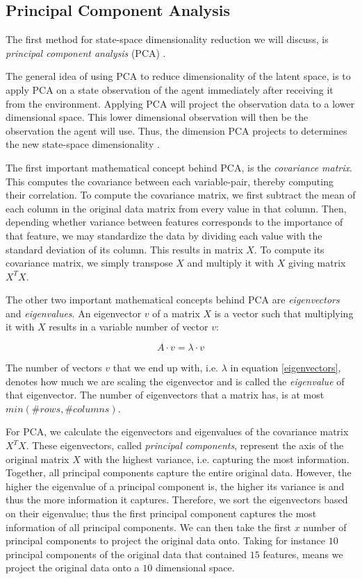 \subsection{Principal Component Analysis}\label{pl-pca}
The first method for state-space dimensionality reduction we will discuss, is \emph{principal component analysis} (PCA) \cite{pca}. 

The general idea of using PCA to reduce dimensionality of the latent space, is to apply PCA on a state observation of the agent immediately after receiving it from the environment. Applying PCA will project the observation data to a lower dimensional space. This lower dimensional observation will then be the observation the agent will use. Thus, the dimension PCA projects to determines the new state-space dimensionality \cite{mario}.

The first important mathematical concept behind PCA, is the \emph{covariance matrix}. This computes the covariance between each variable-pair, thereby computing their correlation. To compute the covariance matrix, we first subtract the mean of each column in the original data matrix from every value in that column. Then, depending whether variance between features corresponds to the importance of that feature, we may standardize the data by dividing each value with the standard deviation of its column. This results in matrix $X$. To compute its covariance matrix, we simply transpose $X$ and multiply it with $X$ giving matrix $X^TX$.

The other two important mathematical concepts behind PCA are \emph{eigenvectors} and \emph{eigenvalues}. An eigenvector $v$ of a matrix $X$ is a vector such that multiplying it with $X$ results in a variable number of vector $v$:

\begin{equation}
\label{eigenvectors}
A \cdot v = \lambda \cdot v
\end{equation}

The number of vectors $v$ that we end up with, i.e. $\lambda$ in equation \ref{eigenvectors}, denotes how much we are scaling the eigenvector and is called the \emph{eigenvalue} of that eigenvector. The number of eigenvectors that a matrix has, is at most $min(\#rows, \#columns)$. 

For PCA, we calculate the eigenvectors and eigenvalues of the covariance matrix $X^TX$. These eigenvectors, called \emph{principal components}, represent the axis of the original matrix $X$ with the highest variance, i.e. capturing the most information. Together, all principal components capture the entire original data. However, the higher the eigenvalue of a principal component is, the higher its variance is and thus the more information it captures. Therefore, we sort the eigenvectors based on their eigenvalue; thus the first principal component captures the most information of all principal components. We can then take the first $x$ number of principal components to project the original data onto. Taking for instance $10$ principal components of the original data that contained $15$ features, means we project the original data onto a $10$ dimensional space.

